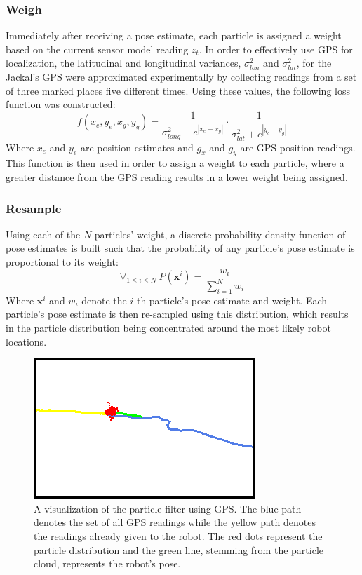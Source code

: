 \documentclass[letterpaper, 10 pt, conference]{ieeeconf}  %
\begin{document}
\subsubsection{Weigh}
Immediately after receiving a pose estimate, each particle is assigned a weight based on the current sensor model reading $z_t$. In order to effectively use GPS for localization, the latitudinal and longitudinal variances, $\sigma _{lon}^2$ and $\sigma _{lat}^2$, for the Jackal's GPS were approximated experimentally by collecting readings from a set of three marked places five different times. Using these values, the following loss function was constructed:
$$
f(x_e,y_e,x_g,y_g)= \frac{1}{\sigma _{long}^2 + e^{|x_e-x_g|}}\cdot \frac{1}{\sigma _{lat}^2 + e^{|y_e-y_g|}}
$$
Where $x_e$ and $y_e$ are position estimates and $g_x$ and $g_y$ are GPS position readings. This function is then used in order to assign a weight to each particle, where a greater distance from the GPS reading results in a lower weight being assigned. 
\subsubsection{Resample} 
Using each of the $N$ particles' weight, a discrete probability density function of pose estimates is built such that the probability of any particle's pose estimate is proportional to its weight: 
$$
\forall _{1\leq i \leq N}~P(\textbf{x}^i)=\frac{w_i}{\sum _{i=1} ^N w_i}
$$
Where $\textbf{x}^i$ and $w_i$ denote the $i$-th particle's pose estimate and weight. Each particle's pose estimate is then re-sampled using this distribution, which results in the particle distribution being concentrated around the most likely robot locations.  

\begin{figure}[h]
\centering
\includegraphics[scale=0.70]{particle_filter_visual}
\caption{A visualization of the particle filter using GPS. The blue path denotes the set of all GPS readings while the yellow path denotes the readings already given to the robot. The red dots represent the particle distribution and the green line, stemming from the particle cloud, represents the robot's pose.}
\end{figure}
\end{document}
